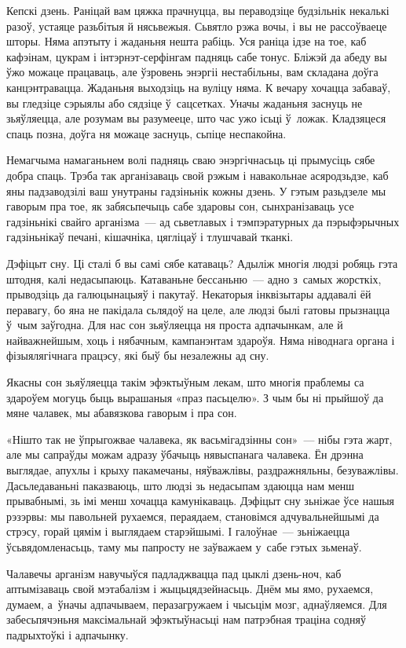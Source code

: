 Кепскі дзень. Раніцай вам цяжка прачнуцца, вы пераводзіце будзільнік некалькі разоў, устаяце разьбітыя й нясьвежыя. Сьвятло рэжа вочы, і вы не рассоўваеце шторы. Няма апэтыту і жаданьня нешта рабіць. Уся раніца ідзе на тое, каб кафэінам, цукрам і інтэрнэт-серфінгам падняць сабе тонус. Бліжэй да абеду вы ўжо можаце працаваць, але ўзровень энэргіі нестабільны, вам складана доўга канцэнтравацца. Жаданьня выходзіць на вуліцу няма. К вечару хочацца забаваў, вы гледзіце сэрыялы або сядзіце ў~сацсетках. Уначы жаданьня заснуць не зьяўляецца, але розумам вы разумееце, што час ужо ісьці ў~ложак. Кладзяцеся спаць позна, доўга ня можаце заснуць, сьпіце неспакойна.

Немагчыма намаганьнем волі падняць сваю энэргічнасьць ці прымусіць сябе добра спаць. Трэба так арганізаваць свой рэжым і навакольнае асяродзьдзе, каб яны падзаводзілі ваш унутраны гадзіньнік кожны дзень. У гэтым разьдзеле мы гаворым пра тое, як забясьпечыць сабе здаровы сон, сынхранізаваць усе гадзіньнікі свайго арганізма~--- ад сьветлавых і тэмпэратурных да пэрыфэрычных гадзіньнікаў печані, кішачніка, цягліцаў і тлушчавай тканкі.

Дэфіцыт сну. Ці сталі б вы самі сябе катаваць? Адыліж многія людзі робяць гэта штодня, калі недасыпаюць. Катаваньне бессаньню~--- адно з~самых жорсткіх, прыводзіць да галюцынацыяў і пакутаў. Некаторыя інквізытары аддавалі ёй перавагу, бо яна не пакідала сьлядоў на целе, але людзі былі гатовы прызнацца ў~чым заўгодна. Для нас сон зьяўляецца ня проста адпачынкам, але й найважнейшым, хоць і нябачным, кампанэнтам здароўя. Няма ніводнага органа і фізыялягічнага працэсу, які быў бы незалежны ад сну. 

Якасны сон зьяўляецца такім эфэктыўным лекам, што многія праблемы са здароўем могуць быць вырашаныя «праз пасьцелю». З чым бы ні прыйшоў да мяне чалавек, мы абавязкова гаворым і пра сон.

«Нішто так не ўпрыгожвае чалавека, як васьмігадзінны сон»~--- нібы гэта жарт, але мы сапраўды можам адразу ўбачыць нявыспанага чалавека. Ён дрэнна выглядае, апухлы і крыху пакамечаны, няўважлівы, раздражняльны, безуважлівы. Дасьледаваньні паказваюць, што людзі зь недасыпам здаюцца нам менш прывабнымі, зь імі менш хочацца камунікаваць. Дэфіцыт сну зьніжае ўсе нашыя рэзэрвы: мы павольней рухаемся, пераядаем, становімся адчувальнейшымі да стрэсу, горай цямім і выглядаем старэйшымі. І галоўнае~--- зьніжаецца ўсьвядомленасьць, таму мы папросту не заўважаем у~сабе гэтых зьменаў.

Чалавечы арганізм навучыўся падладжвацца пад цыклі дзень-ноч, каб аптымізаваць свой мэтабалізм і жыцьцядзейнасьць. Днём мы ямо, рухаемся, думаем, а~ўначы адпачываем, перазагружаем і чысьцім мозг, аднаўляемся. Для забесьпячэньня максімальнай эфэктыўнасьці нам патрэбная траціна содняў падрыхтоўкі і адпачынку.


